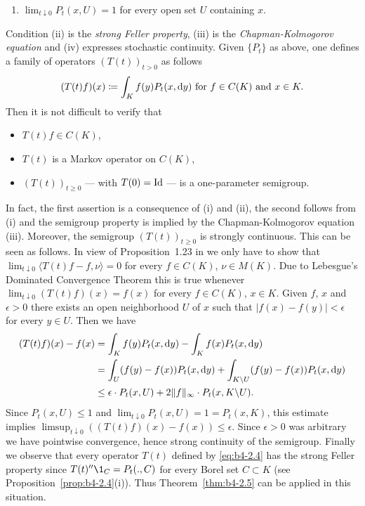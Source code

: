 \begin{example}
\begin{enumerate}[\upshape (i)]
    \item 
    $\lim_{t\downarrow0} P_t(x,U) = 1$ for every open set $U$ containing $x$.
\end{enumerate}
Condition (ii) is the \emph{strong Feller property}, (iii) is the \emph{Chapman-Kolmogorov equation} and (iv) expresses stochastic continuity.
Given $\{P_t\}$ as above, one defines a family of operators $(T(t))_{t>0}$ as follows
\begin{equation}\label{eq:b4-2.4}
    (T(t)f)(x)  \coloneq  \int_K f(y)P_t(x,\mathop{}\!\mathrm{d}{y})  \text{ for } f \in C(K)  \text{ and } x \in K .
\end{equation}
Then it is not difficult to verify that 
\begin{itemize}[-] 
    \item 
    $T(t)f \in C(K)$, 
    \item 
    $T(t)$ is a Markov operator on $C(K)$, 
    \item 
    $(T(t))_{t \geq 0}$ --- with $T(0) = \operatorname{Id} $ --- is a one-parameter semigroup.
\end{itemize}
In fact, the first assertion is a consequence of (i) and (ii), the second follows from (i) and the semigroup property is implied by the Chapman-Kolmogorov equation (iii).
Moreover, the semigroup $(T(t))_{t \geq 0}$ is strongly continuous.
This can be seen as follows. 
In view of Proposition~1.23 in \citet{davies:1980} we only have
to show that $\lim_{t\downarrow 0}\langle T(t)f-f,\nu\rangle = 0$ for every $f \in C(K)$, $\nu \in M(K)$.
Due to Lebesgue's Dominated Convergence Theorem this is true whenever
$\lim_{t\downarrow0}(T(t)f)(x) = f(x)$ for every $f \in C(K)$, $x \in K$.
Given $f$, $x$
and $\epsilon > 0$ there exists an open neighborhood $U$ of $x$ such that
$|f(x) - f(y)| < \epsilon$ for every $y \in U$.
Then we have
\begin{align*} 
    (T(t)f)(x) - f(x) &= \int_K f(y)P_t(x,\mathop{}\!\mathrm{d}{y}) - \int_K f(x)P_t(x,\mathop{}\!\mathrm{d}{y}) \\
    &= \int_U (f(y)-f(x))P_t(x,\mathop{}\!\mathrm{d}{y}) + \int_{K\backslash U} (f(y)-f(x))P_t(x,\mathop{}\!\mathrm{d}{y})  \\
    &\leq \epsilon\cdot P_t(x,U) + 2\|f\|_{\infty}\cdot P_t(x,K\backslash U) .
\end{align*}
Since $P_t(x,U) \leq 1$ and $\lim_{t\downarrow0} P_t(x,U) = 1 = P_t(x,K)$, this estimate
implies $\limsup_{t\downarrow 0}((T(t)f)(x) - f(x)) \leq \epsilon$.
Since $\epsilon > 0$ was arbitrary we have pointwise convergence, hence strong continuity of the semigroup.
Finally we observe that every operator $T(t)$ defined by \eqref{eq:b4-2.4} has the
strong Feller property since $T(t)''\1_C = P_t(.,C)$ for every Borel set
$C \subset K$ (see Proposition~\ref{prop:b4-2.4}(i)).
Thus Theorem~\ref{thm:b4-2.5} can be applied in this situation.
\end{example}

